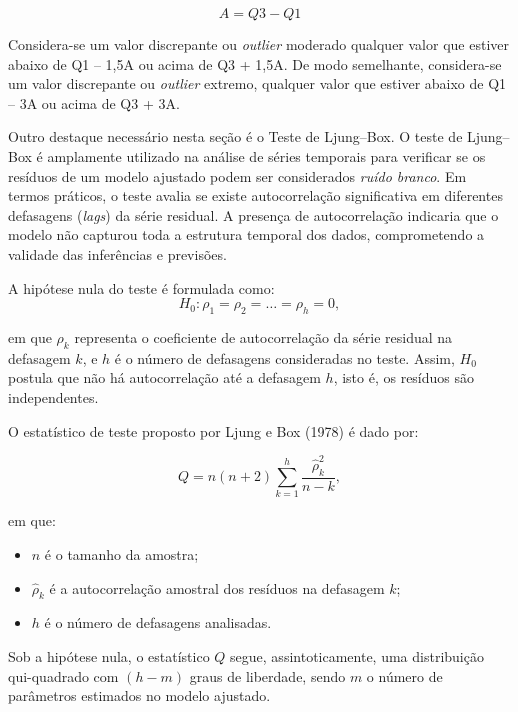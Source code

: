 \documentclass[journal]{IEEEtran}
\begin{document}
 \begin{equation}
    A = Q3 - Q1
    \label{eq:eq-signal}
\end{equation}

Considera-se um valor discrepante ou \emph{outlier} moderado qualquer valor que estiver abaixo de Q1 – 1,5A ou acima de Q3 + 1,5A. De modo semelhante, considera-se um valor discrepante ou \emph{outlier} extremo, qualquer valor que estiver abaixo de Q1 – 3A ou acima de Q3 + 3A\cite{chwif2010}.

Outro destaque necessário nesta seção é o Teste de Ljung--Box. O teste de Ljung--Box é amplamente utilizado na análise de séries temporais para verificar 
se os resíduos de um modelo ajustado podem ser considerados \textit{ruído branco}. 
Em termos práticos, o teste avalia se existe autocorrelação significativa em diferentes 
defasagens (\textit{lags}) da série residual. A presença de autocorrelação indicaria 
que o modelo não capturou toda a estrutura temporal dos dados, comprometendo a validade 
das inferências e previsões.

A hipótese nula do teste é formulada como:
\[
H_0 : \rho_1 = \rho_2 = \dots = \rho_h = 0,
\]

em que $\rho_k$ representa o coeficiente de autocorrelação da série residual na defasagem $k$, 
e $h$ é o número de defasagens consideradas no teste. Assim, $H_0$ postula que não há 
autocorrelação até a defasagem $h$, isto é, os resíduos são independentes.

O estatístico de teste proposto por Ljung e Box (1978) é dado por:

 \begin{equation}
    Q = n (n+2) \sum_{k=1}^{h} \frac{\hat{\rho}_k^2}{n-k},
    \label{eq:eq-signal}
\end{equation}

em que:
\begin{itemize}
    \item $n$ é o tamanho da amostra;
    \item $\hat{\rho}_k$ é a autocorrelação amostral dos resíduos na defasagem $k$;
    \item $h$ é o número de defasagens analisadas.
\end{itemize}

Sob a hipótese nula, o estatístico $Q$ segue, assintoticamente, uma distribuição 
qui-quadrado com $(h-m)$ graus de liberdade, sendo $m$ o número de parâmetros 
estimados no modelo ajustado.
\end{document}
